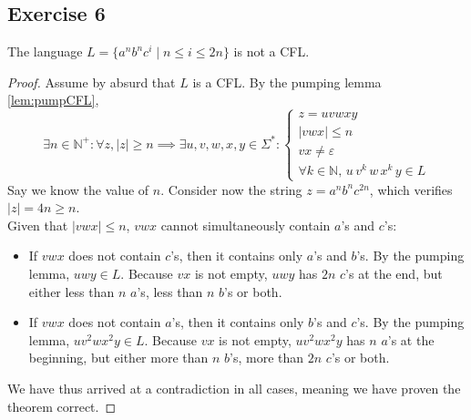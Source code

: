 \documentclass[docid=TP10]{tcom_TP}
\begin{document}
{\subsection{Exercise 6}
\begin{theorem}
The language $L=\{a^nb^nc^i\mid n \leq i \leq 2n\}$ is not a CFL.
\end{theorem}
\begin{proof}
Assume by absurd that $L$ is a CFL. By the pumping lemma \eqref{lem:pumpCFL},
\begin{equation*}
	\exists n \in \mathbb{N}^+ \colon \forall z, |z|\geq n \implies \exists u, v, w, x, y \in \Sigma^* \colon 
	\begin{cases}
		z=uvwxy\\
		|vwx| \leq n\\
		vx \neq \varepsilon \\
		\forall k \in \mathbb{N},\,u\,v^k\,w\,x^k\,y \in L
	\end{cases}
\end{equation*}
Say we know the value of $n$. Consider now the string $z=a^nb^nc^{2n}$, which verifies $|z|=4n \geq n$. \\
Given that $|vwx|\leq n$, $vwx$ cannot simultaneously contain $a$'s and $c$'s:
\begin{itemize}
	\item If $vwx$ does not contain $c$'s, then it contains only $a$'s and $b$'s. By the pumping lemma, $uwy \in L$. Because $vx$ is not empty, $uwy$ has $2n$ $c$'s at the end, but either less than $n$ $a$'s, less than $n$ $b$'s or both.
	\item If $vwx$ does not contain $a$'s, then it contains only $b$'s and $c$'s. By the pumping lemma, $uv^2wx^2y \in L$. Because $vx$ is not empty, $uv^2wx^2y$ has $n$ $a$'s at the beginning, but either more than $n$ $b$'s, more than $2n$ $c$'s or both.
\end{itemize}
We have thus arrived at a contradiction in all cases, meaning we have proven the theorem correct.
\end{proof}
}
\end{document}
